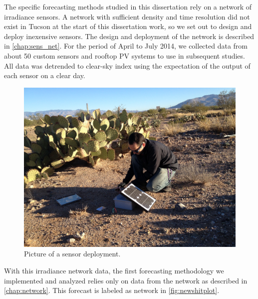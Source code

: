 The specific forecasting methods studied in this dissertation rely on
a network of irradiance sensors.
A network with sufficient density and time resolution did not exist in
Tucson at the start of this dissertation work, so we set out to design
and deploy inexensive sensors.
The design and deployment of the network is described in
\cref{chap:sens_net}.
For the period of April to July 2014, we collected data from about 50
custom sensors and rooftop PV systems to use in subsequent studies.
All data was detrended to clear-sky index using the expectation of the
output of each sensor on a clear day.

\begin{figure}[htb]
\includegraphics[width=\textwidth]{figs/sensdeploy.jpg}
\caption{Picture of a sensor deployment.}
\end{figure}

With this irradiance network data, the first forecasting methodology
we implemented and analyzed relies only on data from the network as
described in \cref{chap:network}.
This forecast is labeled as network in \cref{fig:newshitplot}.


